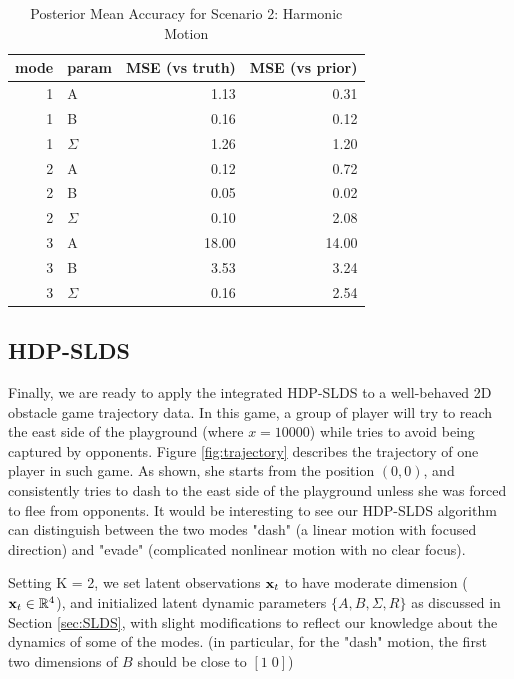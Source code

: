 \documentclass{article} %
\begin{document}
\begin{table}[]
\centering
\caption{Posterior Mean Accuracy for Scenario 2: Harmonic Motion}
\label{tbl:scen2}
\begin{tabular}{rlrr}
\hline
mode & param & MSE (vs truth) & MSE (vs prior) \\ \hline
1    & A     & 1.13      & 0.31       \\
1    & B     & 0.16      & 0.12       \\
1    & $\Sigma$ & 1.26      & 1.20       \\
2    & A     & 0.12      & 0.72       \\
2    & B     & 0.05      & 0.02       \\
2    & $\Sigma$ & 0.10      & 2.08       \\
3    & A     & 18.00     & 14.00      \\
3    & B     & 3.53      & 3.24       \\
3    & $\Sigma$ & 0.16      & 2.54       \\ \hline
\end{tabular}
\end{table}

\subsection{HDP-SLDS}
Finally, we are ready to apply the integrated HDP-SLDS to a well-behaved 2D obstacle game trajectory data. In this game, a group of player will try to reach the east side of the playground (where $x = 10000$) while tries to avoid being captured by opponents. Figure \ref{fig:trajectory} describes the trajectory of one player in  such game. As shown, she starts from the position $(0, 0)$, and consistently tries to dash to the east side of the playground unless she was forced to flee from opponents. It would be interesting to see our HDP-SLDS algorithm can distinguish between the two modes "dash" (a linear motion with focused direction) and "evade" (complicated nonlinear motion with no clear focus). 

Setting K = 2, we set latent observations ${\bf x}_t$ to have moderate dimension (${\bf x}_t \in {\mathbb R}^4$), and initialized latent dynamic parameters $\{A, B, \Sigma, R\}$ as discussed in Section \ref{sec:SLDS}, with slight modifications to reflect our knowledge about the dynamics of some of the modes. (in particular, for the "dash" motion, the first two dimensions of $B$ should be close to $[1 \; 0]$)
\end{document}

